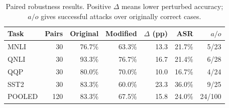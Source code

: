 \begin{table}[H]\centering\small
\begin{tabular}{lrrrrrr}
\toprule
Task & Pairs & Original & Modified & $\Delta$ (pp) & ASR & $a/o$\\
\midrule
MNLI & 30 & 76.7\% & 63.3\% & 13.3 & 21.7\% & 5/23\\
QNLI & 30 & 93.3\% & 76.7\% & 16.7 & 21.4\% & 6/28\\
QQP & 30 & 80.0\% & 70.0\% & 10.0 & 16.7\% & 4/24\\
SST2 & 30 & 83.3\% & 60.0\% & 23.3 & 36.0\% & 9/25\\
POOLED & 120 & 83.3\% & 67.5\% & 15.8 & 24.0\% & 24/100\\
\bottomrule\end{tabular}
\caption{Paired robustness results. Positive $\Delta$ means lower perturbed accuracy; $a/o$ gives successful attacks over originally correct cases.}
\end{table}
